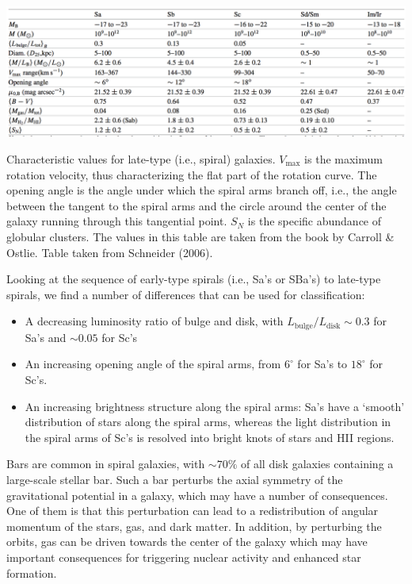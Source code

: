 \documentclass[a4paper,10pt]{article}
\begin{document}
\begin{table}[t]
    \centering
    \includegraphics[width=16cm]{figures/LateGalaxies.png}
    \caption{\footnotesize{Characteristic values for late-type (i.e., spiral) galaxies. $V_\mathrm{max}$ is the maximum rotation velocity, thus characterizing the flat part of the rotation curve. The opening angle is the angle under which the spiral arms branch off, i.e., the angle between the tangent to the spiral arms and the circle around the center of the galaxy running through this tangential point. $S_N$ is the specific abundance of globular clusters. The values in this table are taken from the book by Carroll \& Ostlie. Table taken from Schneider (2006).}}
    \label{table:lategalaxies}
\end{table}

{\noindent}Looking at the sequence of early-type spirals (i.e., Sa's or SBa's) to late-type spirals, we find a number of differences that can be used for classification:

\begin{itemize}
    \item A decreasing luminosity ratio of bulge and disk, with $L_\mathrm{bulge}/L_\mathrm{disk}\sim0.3$ for Sa’s and $\sim0.05$ for Sc’s
    \item An increasing opening angle of the spiral arms, from   $6^\circ$ for Sa's to $18^\circ$ for Sc's.
    \item An increasing brightness structure along the spiral arms: Sa's have a `smooth' distribution of stars along the spiral arms, whereas the light distribution in the spiral arms of Sc's is resolved into bright knots of stars and HII regions.
\end{itemize}

{\noindent}Bars are common in spiral galaxies, with $\sim70\%$ of all disk galaxies containing a large-scale stellar bar. Such a bar perturbs the axial symmetry of the gravitational potential in a galaxy, which may have a number of consequences. One of them is that this perturbation can lead to a redistribution of angular momentum of the stars, gas, and dark matter. In addition, by perturbing the orbits, gas can be driven towards the center of the galaxy which may have important consequences for triggering nuclear activity and enhanced star formation.
\end{document}
